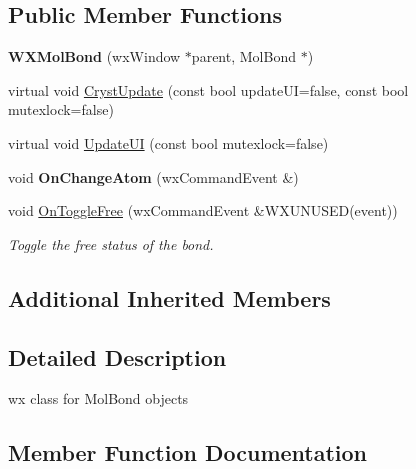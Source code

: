 \subsection*{Public Member Functions}
\begin{DoxyCompactItemize}
\item 
\mbox{\label{class_obj_cryst_1_1_w_x_mol_bond_ad25266fcbb6d661b6074a60561fb476e}} 
{\bfseries W\+X\+Mol\+Bond} (wx\+Window $\ast$parent, Mol\+Bond $\ast$)
\item 
virtual void \mbox{\hyperlink{class_obj_cryst_1_1_w_x_mol_bond_a789742bc7494c3ffddda46e1b91cff54}{Cryst\+Update}} (const bool update\+UI=false, const bool mutexlock=false)
\item 
virtual void \mbox{\hyperlink{class_obj_cryst_1_1_w_x_mol_bond_a75806846321a0254b833f8ff8400bc0f}{Update\+UI}} (const bool mutexlock=false)
\item 
\mbox{\label{class_obj_cryst_1_1_w_x_mol_bond_ae173f51f403c779ae5ae55323a155aa0}} 
void {\bfseries On\+Change\+Atom} (wx\+Command\+Event \&)
\item 
\mbox{\label{class_obj_cryst_1_1_w_x_mol_bond_a49309d4c0e1e06cdccf1e63c66470151}} 
void \mbox{\hyperlink{class_obj_cryst_1_1_w_x_mol_bond_a49309d4c0e1e06cdccf1e63c66470151}{On\+Toggle\+Free}} (wx\+Command\+Event \&W\+X\+U\+N\+U\+S\+ED(event))
\begin{DoxyCompactList}\small\item\em Toggle the \textquotesingle{}free\textquotesingle{} status of the bond. \end{DoxyCompactList}\end{DoxyCompactItemize}
\subsection*{Additional Inherited Members}


\subsection{Detailed Description}
wx class for Mol\+Bond objects 

\subsection{Member Function Documentation}
\mbox{\label{class_obj_cryst_1_1_w_x_mol_bond_a789742bc7494c3ffddda46e1b91cff54}} 
